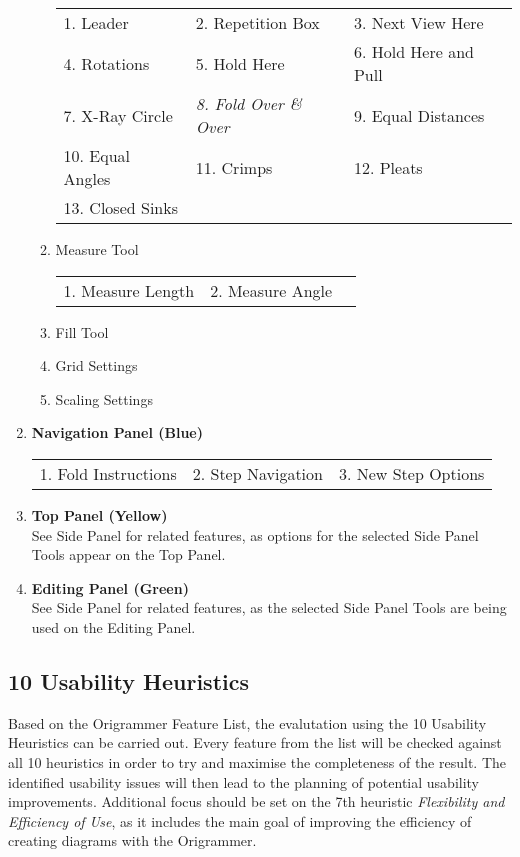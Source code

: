 \begin{enumerate}
\begin{enumerate}
\begin{tabular}{l l l}
        1. Leader & 2. Repetition Box & 3. Next View Here \\
        4. Rotations & 5. Hold Here & 6. Hold Here and Pull \\
        7. X-Ray Circle & \emph{8. Fold Over \& Over} & 9. Equal Distances \\
        10. Equal Angles & 11. Crimps & 12. Pleats \\
        13. Closed Sinks
        \end{tabular}
        \item Measure Tool \\
        \begin{tabular}{l l l}
        1. Measure Length & 2. Measure Angle \\
        \end{tabular}
        \item Fill Tool
        \item Grid Settings
        \item Scaling Settings
    \end{enumerate}
\item \textbf{Navigation Panel (Blue)} \\
\begin{tabular}{l l l}
1. Fold Instructions & 2. Step Navigation & 3. New Step Options \\
\end{tabular}
\item \textbf{Top Panel (Yellow)} \\
See Side Panel for related features, as options for the selected Side Panel Tools appear on the Top Panel.
\item \textbf{Editing Panel (Green)} \\
See Side Panel for related features, as the selected Side Panel Tools are being used on the Editing Panel.
\end{enumerate}
\onehalfspacing

\subsection{10 Usability Heuristics}
\label{sec:usabilityHeuristics}

Based on the Origrammer Feature List, the evalutation using the 10 Usability Heuristics can be carried out. Every feature from the list will be checked against all 10 heuristics in order to try and maximise the completeness of the result. The identified usability issues will then lead to the planning of potential usability improvements. Additional focus should be set on the 7th heuristic \emph{Flexibility and Efficiency of Use}, as it includes the main goal of improving the efficiency of creating diagrams with the Origrammer.


